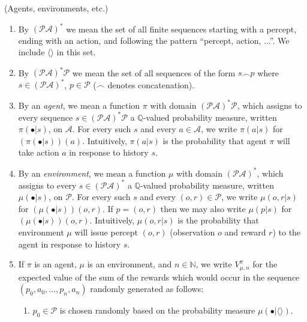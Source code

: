 \documentclass[runningheads]{llncs}
\begin{document}
\begin{definition}
\label{omnibusdefn}
    (Agents, environments, etc.)
    \begin{enumerate}
        \item
        By $(\mathcal P\mathcal A)^*$ we mean the set of
        all finite sequences starting with a percept, ending with an action,
        and following the pattern ``percept, action, ...''.
        We include $\langle\rangle$ in this set.
        \item
        By $(\mathcal P\mathcal A)^* \mathcal P$
        we mean the set of all sequences of the form $s\frown p$ where
        $s\in (\mathcal P\mathcal A)^*$, $p\in\mathcal P$
        ($\frown$ denotes concatenation).
        \item
        By an \emph{agent}, we mean a function $\pi$
        with domain $(\mathcal P\mathcal A)^* \mathcal P$,
        which assigns to every sequence
        $s\in (\mathcal P\mathcal A)^* \mathcal P$ a
        $\mathbb Q$-valued probability measure,
        written $\pi(\bullet|s)$, on $\mathcal A$.
        For every such $s$ and every $a\in\mathcal A$,
        we write $\pi(a|s)$ for $(\pi(\bullet|s))(a)$.
        Intuitively, $\pi(a|s)$ is the probability that agent $\pi$
        will take action $a$ in response to history $s$.
        \item
        By an \emph{environment}, we mean a function $\mu$
        with domain $(\mathcal P\mathcal A)^*$,
        which assigns to every
        $s\in (\mathcal P\mathcal A)^*$
        a $\mathbb Q$-valued probability measure,
        written $\mu(\bullet|s)$,
        on $\mathcal P$.
        For every such $s$ and every $(o,r)\in\mathcal P$,
        we write $\mu(o,r|s)$ for $(\mu(\bullet|s))(o,r)$.
        If $p=(o,r)$ then we may also write $\mu(p|s)$ for
        $(\mu(\bullet|s))(o,r)$.
        Intuitively, $\mu(o,r|s)$ is the probability that environment
        $\mu$ will issue percept $(o,r)$ (observation $o$ and reward $r$)
        to the agent in response to history $s$.
        \item
        If $\pi$ is an agent, $\mu$ is an environment, and $n\in\mathbb N$,
        we write $V^\pi_{\mu,n}$ for the expected value of the sum of
        the rewards which would occur in the sequence
        $(p_0,a_0,\ldots,p_n,a_n)$ randomly generated as follows:
        \begin{enumerate}
            \item $p_0\in \mathcal P$ is chosen randomly based
            on the probability measure $\mu(\bullet|\langle\rangle)$.

\end{enumerate}
\end{enumerate}
\end{definition}
\end{document}
